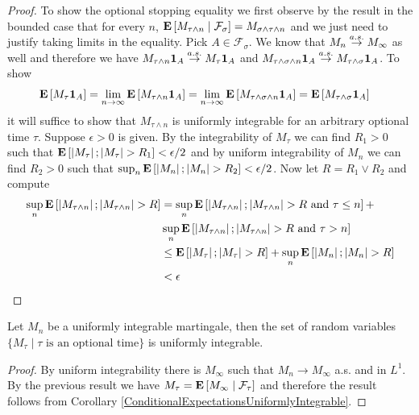 \begin{proof}
To show the optional stopping equality we first observe by the result
in the bounded case that for every $n$, $\cexpectationlong{\mathcal{F}_\sigma}{M_{\tau
    \wedge n}} = M_{\sigma
    \wedge \tau \wedge n}$ and we just need to justify taking limits
  in the equality.  Pick $A \in
  \mathcal{F}_\sigma$.  We know that $M_n \toas M_\infty$ as well and therefore 
we have $M_{\tau
  \wedge n} \characteristic{A} \toas M_\tau \characteristic{A}$ and $M_{\tau
  \wedge \sigma \wedge n} \characteristic{A} \toas M_{\tau \wedge \sigma} \characteristic{A}$.  To
show 
\begin{align*}
\expectation{M_\tau \characteristic{A}} 
&= \lim_{n\to \infty} \expectation{M_{\tau
  \wedge n} \characteristic{A}} = \lim_{n\to \infty} \expectation{M_{\tau
  \wedge \sigma \wedge n} \characteristic{A}} 
= \expectation{M_{\tau \wedge \sigma} \characteristic{A}}
\end{align*} 
it will suffice to show that $M_{\tau \wedge n}$
is uniformly integrable for an arbitrary optional time $\tau$.  Suppose $\epsilon > 0$ is given.  By the
integrability of $M_\tau$ we can find $R_1 > 0$ such that
$\expectation{\abs{M_\tau}; \abs{M_\tau} > R_1} < \epsilon/2$ and by
uniform integrability of $M_n$ we can find $R_2 > 0$ such that $\sup_n
\expectation{\abs{M_n} ; \abs{M_n} > R_2} < \epsilon/2$.  Now let $R =
R_1 \vee R_2$ and compute
\begin{align*}
\sup_n \expectation{\abs{M_{\tau \wedge n}} ; \abs{M_{\tau \wedge n}}
  > R} &= \sup_n \expectation{\abs{M_{\tau \wedge n}} ; \abs{M_{\tau \wedge n}}
  > R \text{ and } \tau \leq n} + \\
&\sup_n \expectation{\abs{M_{\tau \wedge n}} ; \abs{M_{\tau \wedge n}}
  > R \text{ and } \tau > n} \\
&\leq \expectation{\abs{M_{\tau}} ; \abs{M_{\tau}}
  > R } + \sup_n \expectation{\abs{M_{n}} ; \abs{M_{n}}
  > R } \\
&< \epsilon
\end{align*}
\end{proof}

\begin{cor}Let $M_n$ be a uniformly integrable martingale, then the
  set of random variables $\lbrace M_\tau \mid \tau \text{ is an optional time}\rbrace$ is
  uniformly integrable.
\end{cor}
\begin{proof}
By uniform integrability there is $M_\infty$ such that $M_n \to
M_\infty$ a.s. and in $L^1$.  By the previous result we have $M_\tau =
\cexpectationlong{\mathcal{F}_\tau}{M_\infty}$ and therefore the
result follows from Corollary \ref{ConditionalExpectationsUniformlyIntegrable}.
\end{proof}


